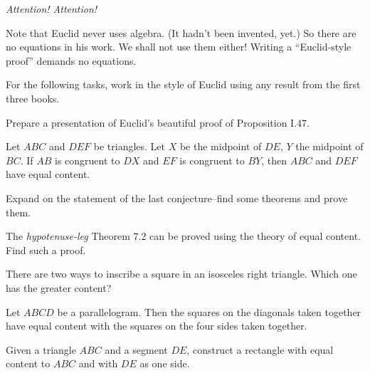 \begin{center}\textit{Attention! Attention!}\end{center}

Note that Euclid never uses algebra. (It hadn't been invented, yet.) So there are no equations in his work. We shall not use them either! Writing a ``Euclid-style proof'' demands no equations.


For the following tasks, work in the style of Euclid using any result from the first three books.

\begin{problem}\label{prob:present-pythagoras} 
Prepare a presentation of Euclid's beautiful proof of Proposition I.47.
\end{problem}

\begin{conjecture}\label{conj:false-area}
Let $ABC$ and $DEF$ be triangles. Let $X$ be the midpoint of $DE$, $Y$ the midpoint of $BC$. If $AB$ is congruent to $DX$ and $EF$ is congruent to $BY$, then $ABC$ and $DEF$ have equal content.
\end{conjecture}


\begin{problem}\label{prob:expand-false-area}
Expand on the statement of the last conjecture--find some theorems and prove them.
\end{problem}

\begin{problem}\label{prob:RASS-area} 
The \emph{hypotenuse-leg} Theorem 7.2 can be proved using the theory of equal content. Find such a proof.
\end{problem}

\begin{question}
There are two ways to inscribe a square in an isosceles right triangle. Which one has the greater content?
\end{question}

\begin{conjecture}\label{conj:parallelogram-law}
Let $ABCD$ be a parallelogram. Then the squares on the diagonals taken together have equal content with the squares on the four sides taken together.
\end{conjecture}



\begin{problem}\label{prob:rectify-triangle}
Given a triangle $ABC$ and a segment $DE$, construct a rectangle with equal content to $ABC$ and with $DE$ as one side.
\end{problem}

